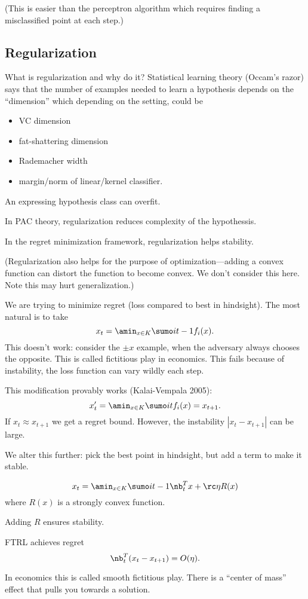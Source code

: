 (This is easier than the perceptron algorithm which requires finding a misclassified point at each step.)

\subsection{Regularization}

What is regularization and why do it? 
Statistical learning theory (Occam's razor) says that the number of examples needed to learn a hypothesis depends on the ``dimension'' which depending on the setting, could be
\begin{itemize}
\item
VC dimension
\item
fat-shattering dimension
\item
Rademacher width
\item
margin/norm of linear/kernel classifier.
\end{itemize}

An expressing hypothesis class can overfit. 

In PAC theory, regularization reduces complexity of the hypothessis.

In the regret minimization framework, regularization helps stability.

(Regularization also helps for the purpose of optimization---adding a convex function can distort the function to become convex. We don't consider this here. Note this may hurt generalization.)


We are trying to minimize regret (loss compared to best in hindsight). The most natural is to take
$$
x_t = \amin_{x\in K} \sumo i{t-1}f_i(x).
$$
This doesn't work: consider the $\pm x$ example, when the adversary always chooses the opposite.
This is called fictitious play in economics.
This fails because of instability, the loss function can vary wildly each step.

This modification provably works (Kalai-Vempala 2005):
$$x_t' = \amin_{x\in K}\sumo it f_i(x) = x_{t+1}.$$
If $x_t\approx x_{t+1}$ we get a regret bound. However, the instability $|x_t-x_{t+1}|$ can be large.

We alter this further: pick the best point in hindsight, but add a term to make it stable. 
\begin{alg}
$$
x_t = \amin_{x\in K} \sumo i{t-1}\nb_t^Tx + \rc \eta R(x)
$$
where 
$R(x)$ is a strongly convex function.
\end{alg}
Adding $R$ ensures stability.
\begin{thm}
FTRL achieves regret
$$
\nb_t^T(x_t-x_{t+1}) = O(\eta).
$$
\end{thm}
In economics this is called smooth fictitious play.
There is a ``center of mass'' effect that pulls you towards a solution.

